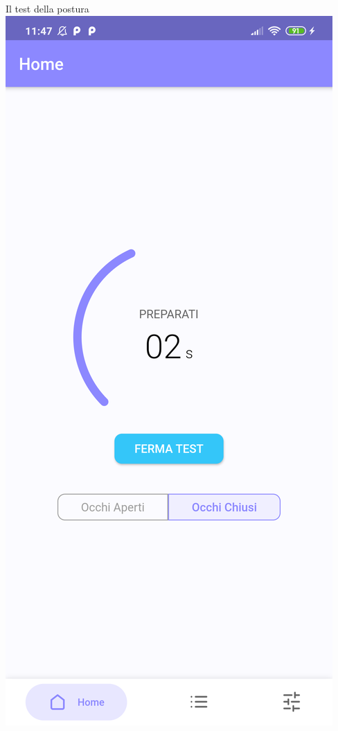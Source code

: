 \documentclass{beamer}
\begin{document}
    \begin{frame}{Il test della postura}
        \centering
        \includegraphics[scale=0.09]{../figures/screenshot/redmi_note_8t/home_measure.png}
    \end{frame}
\end{document}
